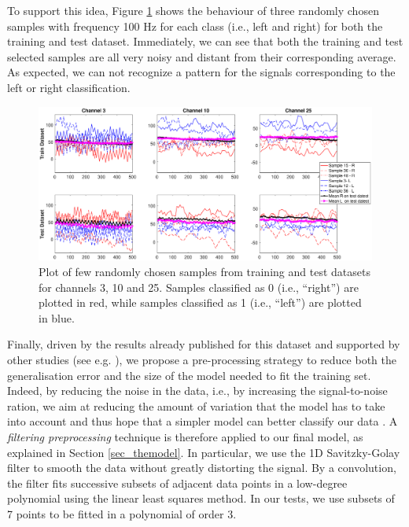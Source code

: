 \documentclass{article}
\begin{document}
 To support this idea, Figure \ref{fig_fewsamples_vs_mean_downsampled}  shows the behaviour of three randomly chosen samples with frequency 100 Hz for each class (i.e., left and right) for both the training and test dataset. 
 Immediately, we can see that both the training and test selected samples are all very noisy and distant from their corresponding average.
 As expected, we can not recognize a pattern for the signals corresponding to the left or right classification. 
  \begin{figure}[t]
 \begin{center}
  \includegraphics[width=1\textwidth]{fig/fig5new_fewsamples_mean_downsampled} 
  \caption{Plot of few randomly chosen samples from training and test datasets for channels 3, 10 and 25.
  Samples classified as 0 (i.e., ``right'') are plotted in red, while   samples classified as 1 (i.e., ``left'') are plotted in blue.
  \label{fig_fewsamples_vs_mean_downsampled}}
  \end{center}
  \end{figure}

Finally, driven by the results already published for this dataset \cite{bci_ii} and supported by other studies (see e.g. \cite{schirrmeister2017deep}), we propose a pre-processing strategy to reduce both the generalisation error and the size of the model needed to fit the training set.
Indeed, by reducing the noise in the data, i.e., by increasing the signal-to-noise ration, we aim at reducing the amount of variation that the model has to take into account and thus hope that a simpler model can better classify our data  \cite{goodfellow2016deep} . 
A \emph{filtering preprocessing} technique is therefore applied to our  final model, as explained in Section \ref{sec_themodel}.
In particular, we use the 1D Savitzky-Golay filter \cite{savgol} to smooth the data without greatly distorting the signal. 
By a convolution, the filter fits successive subsets of adjacent data points in a low-degree polynomial using the linear least squares method. 
In our tests, we use subsets of 7 points to be fitted in a polynomial of order 3. 
\end{document}
